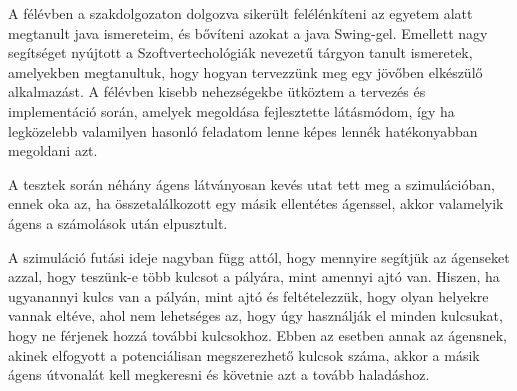 
A félévben a szakdolgozaton dolgozva sikerült felélénkíteni az egyetem alatt megtanult java ismereteim,
és bővíteni azokat a java Swing-gel. Emellett nagy segítséget nyújtott a Szoftvertechológiák nevezetű tárgyon
tanult ismeretek, amelyekben megtanultuk, hogy hogyan tervezzünk meg egy jövőben elkészülő alkalmazást.
A félévben kisebb nehezségekbe ütköztem a tervezés és implementáció során, amelyek megoldása fejlesztette látásmódom,
így ha legközelebb valamilyen hasonló feladatom lenne képes lennék hatékonyabban megoldani azt.

A tesztek során néhány ágens látványosan kevés utat tett meg a szimulációban, ennek oka az, ha összetalálkozott egy másik
ellentétes ágenssel, akkor valamelyik ágens a számolások után elpusztult.

A szimuláció futási ideje nagyban függ attól, hogy mennyire segítjük az ágenseket azzal, hogy teszünk-e több kulcsot a pályára, mint
amennyi ajtó van. Hiszen, ha ugyanannyi kulcs van a pályán, mint ajtó és feltételezzük, hogy olyan helyekre vannak eltéve, ahol
nem lehetséges az, hogy úgy használják el minden kulcsukat, hogy ne férjenek hozzá további kulcsokhoz. Ebben az esetben annak az ágensnek, akinek elfogyott
a potenciálisan megszerezhető kulcsok száma, akkor a másik ágens útvonalát kell megkeresni és követnie azt a tovább haladáshoz.